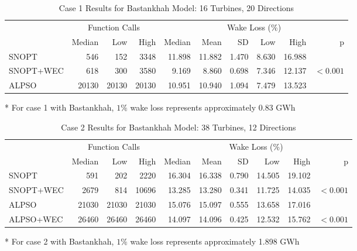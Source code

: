 \documentclass[journal abbreviation, manuscript]{copernicus}
\begin{document}
	\begin{table}
		\centering
		\caption{Case 1 Results for Bastankhah Model: 16 Turbines, 20 Directions}
		\label{tab:case1}
		\begin{threeparttable}
			\begin{tabular}{lrrrrrrrrr}
				\toprule
				{} & \multicolumn{3}{c}{Function Calls} & \multicolumn{6}{c}{Wake Loss (\%)\tnote{*}} \\
				\cmidrule(lr){2-4} \cmidrule(lr){5-10}
				{} &         Median &    Low &   High &        Median &   Mean &    SD &   Low &   High &          p \\
				\cmidrule(lr){2-4} \cmidrule(lr){5-10}
				SNOPT     &            546 &    152 &   3348 &        11.898 & 11.882 & 1.470 & 8.630 & 16.988 &            \\
				SNOPT+WEC &            618 &    300 &   3580 &         9.169 &  8.860 & 0.698 & 7.346 & 12.137 &  $< 0.001$ \\
				ALPSO     &          20130 &  20130 &  20130 &        10.951 & 10.940 & 1.094 & 7.479 & 13.523 &            \\
				\bottomrule
			\end{tabular}
			\begin{tablenotes}
				\item[*]For case 1 with Bastankhah, $1\%$ wake loss represents approximately 0.83 GWh
			\end{tablenotes}	
		\end{threeparttable}
	\end{table}
	\begin{table}
		\centering
		\caption{Case 2 Results for Bastankhah Model: 38 Turbines, 12 Directions}
		\label{tab:case2}
		\begin{threeparttable}
			\begin{tabular}{lrrrrrrrrr}
				\toprule
				{} & \multicolumn{3}{c}{Function Calls} & \multicolumn{6}{c}{Wake Loss (\%)\tnote{*}} \\
				\cmidrule(lr){2-4} \cmidrule(lr){5-10}
				{} &         Median &    Low &   High &        Median &   Mean &    SD &    Low &   High &          p \\
				\cmidrule(lr){2-4} \cmidrule(lr){5-10}
				SNOPT     &            591 &    202 &   2220 &        16.304 & 16.338 & 0.790 & 14.505 & 19.102 &            \\
				SNOPT+WEC &           2679 &    814 &  10696 &        13.285 & 13.280 & 0.341 & 11.725 & 14.035 &  $< 0.001$ \\
				ALPSO     &          21030 &  21030 &  21030 &        15.076 & 15.097 & 0.555 & 13.658 & 17.016 &            \\
				ALPSO+WEC &          26460 &  26460 &  26460 &        14.097 & 14.096 & 0.425 & 12.532 & 15.762 &  $< 0.001$ \\
				\bottomrule
			\end{tabular}
			\begin{tablenotes}
				\item[*] For case 2 with Bastankhah, $1\%$ wake loss represents approximately 1.898 GWh
			\end{tablenotes}		
		\end{threeparttable}
	\end{table}
\end{document}
